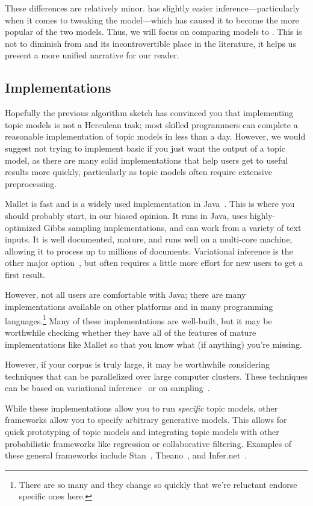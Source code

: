 These differences are relatively minor.   has slightly easier
inference---particularly when it comes to tweaking the model---which
has caused it to become the more popular of the two models.  Thus, we
will focus on comparing models to .  This is
not to diminish from \plsa{} and its incontrovertible place in the
literature, it helps us present a more unified narrative for our reader.

\subsection{Implementations}

Hopefully the previous algorithm sketch has convinced you that implementing
topic models is not a Herculean task; most skilled programmers can complete a
reasonable implementation of topic models in less than a day.  However, we would
suggest not trying to implement basic  if you just want the
output of a topic model, as there are many solid
implementations that help users get to useful results more quickly, particularly
as topic models often require extensive preprocessing.

Mallet is fast and is a widely used implementation in Java~\citep{mallet}.  This
is where you should probably start, in our biased opinion.  It runs in Java, uses
highly-optimized Gibbs sampling implementations, and can work from a variety of
text inputs.  It is well documented, mature, and runs well on a multi-core
machine, allowing it to process up to millions of documents.  Variational
inference is the other major option~\citep{blei-03,vw}, but often requires a
little more effort for new users to get a first result.

However, not all users are comfortable with Java; there are many
implementations available on other platforms and in many programming
languages.\footnote{There are so many and they change so quickly that
  we're reluctant endorse specific ones here.}  Many of these
implementations are well-built, but it may be worthwhile checking
whether they have all of the features of mature implementations like
Mallet so that you know what (if anything) you're missing.

However, if your corpus is truly large, it may be worthwhile
considering techniques that can be parallelized over large computer
clusters.  These techniques can be based on variational
inference~\citep{Narayanamurthy-11,zhai-12} or on
sampling~\citep{newman-08}.

While these implementations allow you to run \emph{specific} topic
models, other frameworks allow you to specify arbitrary generative
models.  This allows for quick prototyping of topic models and
integrating topic models with other probabilistic frameworks like
regression or collaborative filtering.  Examples of these general
frameworks include Stan~\citep{stan-software:2014},
Theano~\citep{theano}, and Infer.net~\citep{InferNET14}.

